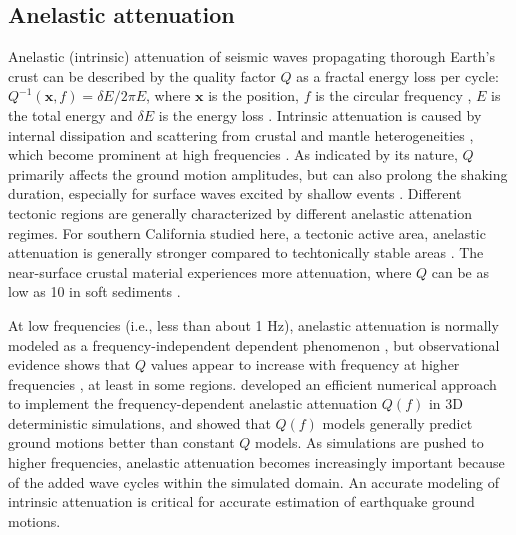 \subsection{Anelastic attenuation}

Anelastic (intrinsic) attenuation of seismic waves propagating thorough Earth's crust can be described by the quality factor $Q$ as a fractal energy loss per cycle: $Q^{-1}(\textbf{x}, f) = \delta E / 2\pi E$, where $\textbf{x}$ is the position, $f$ is the circular frequency , $E$ is the total energy and $\delta E$ is the energy loss \citep{oconnellMeasuresDissipationViscoelastic1978} . Intrinsic attenuation is caused by internal dissipation and scattering from crustal and mantle heterogeneities \citep{satoSeismicWavePropagation2009}, which become prominent at high frequencies \citep[($f \geqslant  1$ Hz); e.g., ][]{sato2012seismic}. As indicated by its nature, $Q$ primarily affects the ground motion amplitudes, but can also prolong the shaking duration, especially for surface waves excited by shallow events \citep{imperatoriRoleTopographyLateral2015, laiShallowBasinStructure2020}. Different tectonic regions are generally characterized by different anelastic attenation regimes. For southern California studied here, a tectonic active area, anelastic attenuation is generally stronger compared to techtonically stable areas \citep{frankelAttenuationHighfrequencyShear1990,ericksonFrequencyDependentLgContinental2004}. The near-surface crustal material experiences more attenuation, where $Q$ can be as low as 10 in soft sediments \citep{asterHighfrequencyBoreholeSeismograms1991,abercrombieNearsurfaceAttenuationSite1997}.

At low frequencies (i.e., less than about 1 Hz), anelastic attenuation is normally modeled as a frequency-independent dependent phenomenon \citep{akiQuantitativeSeismology2002}, but observational evidence shows that $Q$ values appear to increase with frequency at higher frequencies , at least in some regions. \citet{withersMemoryEfficientSimulation2015} developed an efficient numerical approach to implement the frequency-dependent anelastic attenuation $Q(f)$ in 3D deterministic simulations, and showed that $Q(f)$ models generally predict ground motions better than constant $Q$ models. As simulations are pushed to higher frequencies, anelastic attenuation becomes increasingly important because of the added wave cycles within the simulated domain. An accurate modeling of intrinsic attenuation is critical for accurate estimation of earthquake ground motions.

